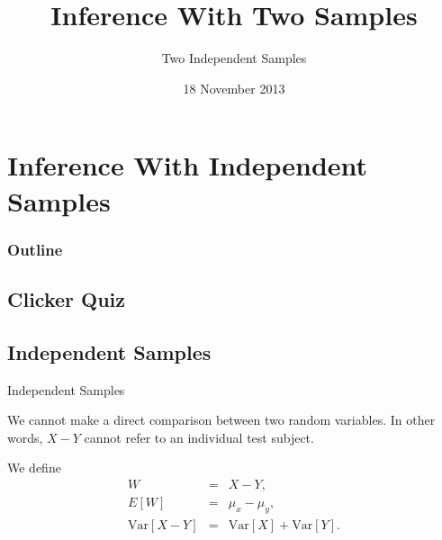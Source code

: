 
\section{Inference With Independent Samples}

\title{Inference With Two Samples}
\subtitle{Two Independent Samples}

\date{18 November 2013}

\begin{frame}
  \titlepage
\end{frame}

\begin{frame}
  \frametitle{Outline}
  \tableofcontents[hideothersubsections,sectionstyle=show/hide]
\end{frame}


\subsection{Clicker Quiz}



\subsection{Independent Samples}

\begin{frame}{Independent Samples}
  
  \vfill

  We cannot make a direct comparison between two random variables. In
  other words, $X-Y$ cannot refer to an individual test subject.

  \vfill

  We define 
  \begin{eqnarray*}
    W & = & X - Y, \\
    E[W] & = & \mu_x - \mu_y, \\
    \mathrm{Var}[X-Y] & = & \mathrm{Var}[X] + \mathrm{Var}[Y].
  \end{eqnarray*}

  \vfill

\end{frame}


